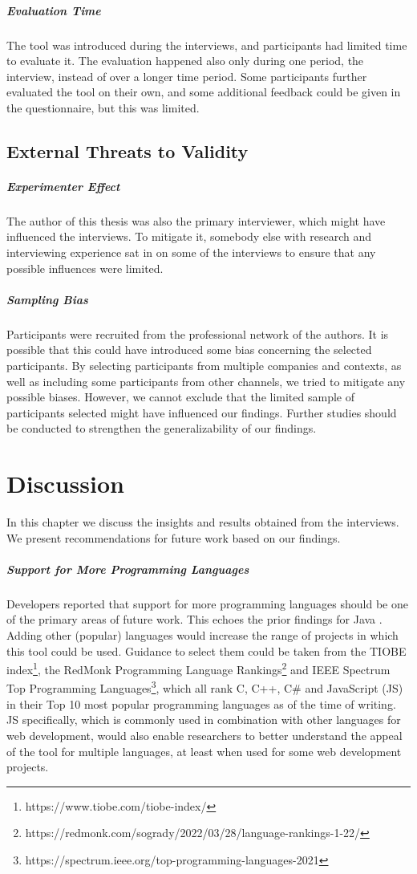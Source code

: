 \documentclass[a4paper,11pt,twoside]{article}
\theoremstyle{definition} %
\begin{document}
\subparagraph{Evaluation Time}
The tool was introduced during the interviews, and participants had limited time to evaluate it. The evaluation happened also only during one period, the interview, instead of over a longer time period. Some participants further evaluated the tool on their own, and some additional feedback could be given in the questionnaire, but this was limited.


\subsection{External Threats to Validity} \label{SubSec:ExternalThreatsValidity}

\subparagraph{Experimenter Effect}
The author of this thesis was also the primary interviewer, which might have influenced the interviews. To mitigate it, somebody else with research and interviewing experience sat in on some of the interviews to ensure that any possible influences were limited.

\subparagraph{Sampling Bias}
Participants were recruited from the professional network of the authors. It is possible that this could have introduced some bias concerning the selected participants. By selecting participants from multiple companies and contexts, as well as including some participants from other channels, we tried to mitigate any possible biases. However, we cannot exclude that the limited sample of participants selected might have influenced our findings. Further studies should be conducted to strengthen the generalizability of our findings.

\newpage


\section{Discussion} \label{Sec:Discussion}
In this chapter we discuss the insights and results obtained from the interviews. We present recommendations for future work based on our findings.

\subparagraph{Support for More Programming Languages}
Developers reported that support for more programming languages should be one of the primary areas of future work. This echoes the prior findings for Java \citep{cr_visualization_major, publication-20661}. Adding other (popular) languages would increase the range of projects in which this tool could be used. Guidance to select them could be taken from the TIOBE index\footnote{https://www.tiobe.com/tiobe-index/}, the RedMonk Programming Language Rankings\footnote{https://redmonk.com/sogrady/2022/03/28/language-rankings-1-22/} and IEEE Spectrum Top Programming Languages\footnote{https://spectrum.ieee.org/top-programming-languages-2021}, which all rank C, C++, C\# and JavaScript (JS) in their Top 10 most popular programming languages as of the time of writing.
JS specifically, which is commonly used in combination with other languages for web development, would also enable researchers to better understand the appeal of the tool for multiple languages, at least when used for some web development projects.
\end{document}
